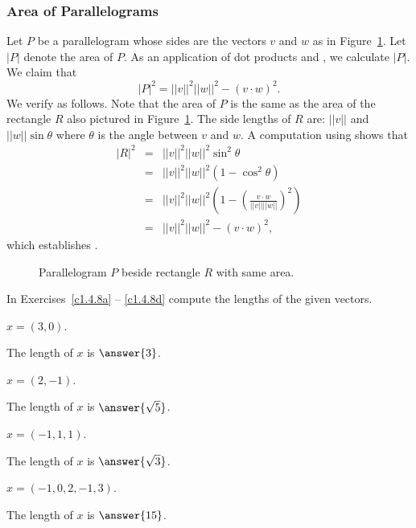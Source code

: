 \documentclass{ximera}
\begin{document}
\subsubsection{Area of Parallelograms}

Let $P$ be a parallelogram whose sides are the vectors $v$ and $w$ as
in Figure~\ref{F:parallel}.  Let $|P|$ denote the area of $P$.  As an
application of dot products  and
, we calculate $|P|$. 
We claim that
\begin{equation}  \label{e:areaP}
|P|^2 = ||v||^2||w||^2 - (v\cdot w)^2.
\end{equation}
We verify  as follows.  Note that the area of $P$
is the same as the area of the rectangle $R$ also pictured in
Figure~\ref{F:parallel}.  The side lengths of $R$ are: $||v||$ and
$||w||\sin\theta$ where $\theta$ is the angle between $v$ and $w$.
A computation using  shows that
\begin{eqnarray*}
|R|^2 & = & ||v||^2 ||w||^2\sin^2\theta \\
& = & ||v||^2 ||w||^2(1-\cos^2\theta) \\
& = & ||v||^2 ||w||^2\left(1-\left(\frac{v\cdot w}{||v|| ||w||}
\right)^2\right)\\
& = & ||v||^2 ||w||^2 - (v\cdot w)^2,
\end{eqnarray*}
which establishes .

\begin{figure}[htb]
     \centerline{%
     }
     \caption{Parallelogram $P$ beside rectangle $R$ with same area.}
     \label{F:parallel}
\end{figure}


\EXER

\TEXER

\noindent In Exercises~\ref{c1.4.8a} -- \ref{c1.4.8d}
compute the lengths of the given vectors.
\begin{exercise} \label{c1.4.8a}
$x=(3,0)$.  \begin{prompt} The length of $x$ is $\answer{3}$.\end{prompt}
\end{exercise}
\begin{exercise} \label{c1.4.8b}
$x=(2,-1)$.  \begin{prompt} The length of $x$ is $\answer{\sqrt{5}}$.\end{prompt}
\end{exercise}
\begin{exercise} \label{c1.4.8c}
$x=(-1,1,1)$.  \begin{prompt} The length of $x$ is $\answer{\sqrt{3}}$.\end{prompt}
\end{exercise}
\begin{exercise} \label{c1.4.8d}
$x=(-1,0,2,-1,3)$.  \begin{prompt} The length of $x$ is $\answer{15}$.\end{prompt}
\end{exercise}
\end{document}
